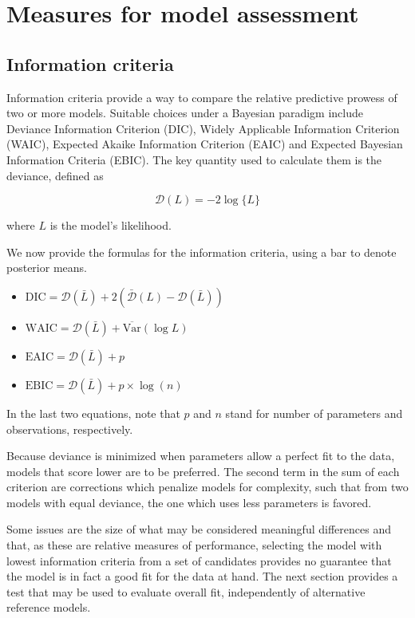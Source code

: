 \section{Measures for model assessment}
\label{sec:modcomp}

\subsection{Information criteria}

Information criteria provide a way to compare the relative predictive prowess of two or more models. Suitable choices under a Bayesian paradigm include Deviance Information Criterion (DIC), Widely Applicable Information Criterion (WAIC), Expected Akaike Information Criterion (EAIC) and Expected Bayesian Information Criteria (EBIC). The key quantity used to calculate them is the deviance, defined as

\begin{equation}
\mathcal{D}(L)=-2\log\{L\}
\end{equation}

\noindent where $L$ is the model's likelihood.

We now provide the formulas for the information criteria, using a bar to denote posterior means.

\begin{itemize}
\item $\text{DIC}=\mathcal{D}(\bar L) + 2(\bar{\mathcal{D}} (L) - \mathcal{D} (\bar L))$
\item $\text{WAIC}=\mathcal{D}(\bar L) + \overline{\text{Var}}(\log L)$
\item $\text{EAIC}=\mathcal{D}(\bar L) + p$
\item $\text{EBIC}=\mathcal{D}(\bar L) + p \times \log (n)$
\end{itemize}

In the last two equations, note that $p$ and $n$ stand for number of parameters and observations, respectively.

Because deviance is minimized when parameters allow a perfect fit to the data, models that score lower are to be preferred. The second term in the sum of each criterion are corrections which penalize models for complexity, such that from two models with equal deviance, the one which uses less parameters is favored.

Some issues are the size of what may be considered meaningful differences and that, as these are relative measures of performance, selecting the model with lowest information criteria from a set of candidates provides no guarantee that the model is in fact a good fit for the data at hand. The next section provides a test that may be used to evaluate overall fit, independently of alternative reference models.

